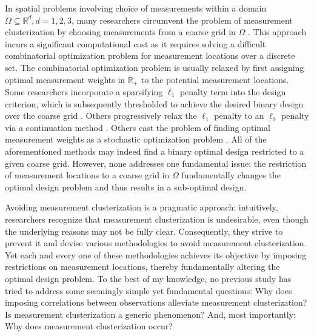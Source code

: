 In spatial problems involving choice of measurements within a domain
\(\Omega \subseteq \mathbb{R}^d, d=1,2,3\), many researchers
circumvent the problem of measurement clusterization by choosing
measurements from a coarse grid in \(\Omega\) \cite{koval2020,
  alexanderian2021, attia2022, alexanderian2014, alexanderian2016,
  alexanderian2018efficient, brunton2016}. This approach incurs a
significant computational cost as it requires solving a difficult
combinatorial optimization problem for measurement locations over a
discrete set. The combinatorial optimization problem is usually
relaxed by first assigning optimal measurement weights in
\(\mathbb{R}_+\) to the potential measurement locations. Some
researchers incorporate a sparsifying \(\ell_1\) penalty term into the
design criterion, which is subsequently thresholded to achieve the
desired binary design over the coarse grid
\cite{horesh2008borehole}. Others progressively relax the \(\ell_1\)
penalty to an \(\ell_0\) penalty via a continuation method
\cite{alexanderian2016, alexanderian2014}. Others cast the problem of
finding optimal measurement weights as a stochastic optimization
problem \cite{attia2022stochastic}. All of the aforementioned methods
may indeed find a binary optimal design restricted to a given coarse
grid. However, none addresses one fundamental issue: the restriction
of measurement locations to a coarse grid in \(\Omega\) fundamentally
changes the optimal design problem and thus results in a sub-optimal
design.

Avoiding measurement clusterization is a pragmatic approach:
intuitively, researchers recognize that measurement clusterization is
undesirable, even though the underlying reasons may not be fully
clear. Consequently, they strive to prevent it and devise various
methodologies to avoid measurement clusterization. Yet each and every
one of these methodologies achieves its objective by imposing
restrictions on measurement locations, thereby fundamentally altering
the optimal design problem. To the best of my knowledge, no previous
study has tried to address some seemingly simple yet fundamental
questions:
%
Why does imposing correlations between observations alleviate
measurement clusterization?
%
Is measurement clusterization a generic phenomenon? 
%
And, most importantly: Why does measurement clusterization occur?
%
%


